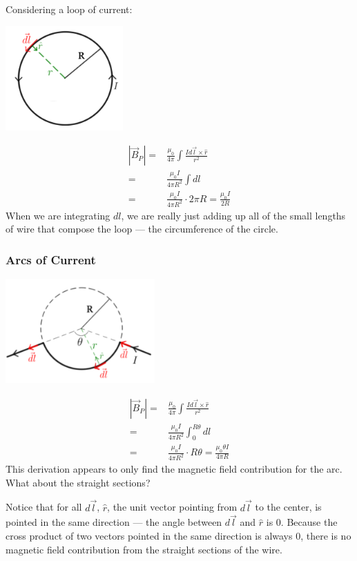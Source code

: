\documentclass[12pt, titlepage]{article}
\begin{document}
Considering a loop of current: 
\begin{center}
    \includegraphics*[height=4cm]{media/loop.png}
\end{center}
\begin{align*}
    |\vec{B}_P| =& \frac{\mu_0}{4\pi} \int \frac{Id\vec{l}\times\hat{r}}{r^2} \\
    =& \frac{\mu_0I}{4 \pi R^2} \int dl \\
    =& \frac{\mu_0I}{4 \pi R^2} \cdot 2\pi R = \boxed{\frac{\mu_0I}{2R}}
\end{align*}
When we are integrating $dl$, we are really just adding up all of the small lengths of wire that compose the loop --- the circumference  of the circle.

\subsubsection*{Arcs of Current}
\begin{center}
    \includegraphics*[height=4cm]{media/bentloop.png}
\end{center}
\begin{align*}
    |\vec{B}_P| =& \frac{\mu_0}{4\pi} \int \frac{Id\vec{l}\times\hat{r}}{r^2} \\
    =& \frac{\mu_0I}{4 \pi R^2} \int_{0}^{R \theta} dl \\
    =& \frac{\mu_0I}{4 \pi R^2} \cdot R\theta = \boxed{\frac{\mu_0 \theta I}{4 \pi R}}
\end{align*}
This derivation appears to only find the magnetic field contribution for the arc. What about the straight sections?

Notice that for all $d\vec{l}$, $\hat{r}$, the unit vector pointing from $d\vec{l}$ to the center, is pointed in the same direction --- the angle between $d\vec{l}$ and $\hat{r}$ is 0. Because the cross product of two vectors pointed in the same direction is always 0, there is no magnetic field contribution from the straight sections of the wire.
\end{document}
